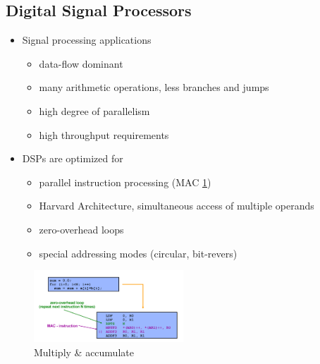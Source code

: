 \subsection{Digital Signal Processors}
\begin{itemize}
	\item Signal processing applications
	\begin{itemize}
		\item data-flow dominant
		\item many arithmetic operations, less branches and jumps
		\item high degree of parallelism
		\item high throughput requirements
	\end{itemize}
	\item DSPs are optimized for
	\begin{itemize}
		\item parallel instruction processing (MAC \cref{fig:MAC})
		\item Harvard Architecture, simultaneous access of multiple operands
		\item zero-overhead loops
		\item special addressing modes (circular, bit-revers)
	\end{itemize}
\end{itemize}

\begin{figure}
\begin{center}
	\includegraphics[width=0.5\textwidth]{images/MAC.png}
	\caption{Multiply \& accumulate}
	\label{fig:MAC}
\end{center}
\end{figure}

